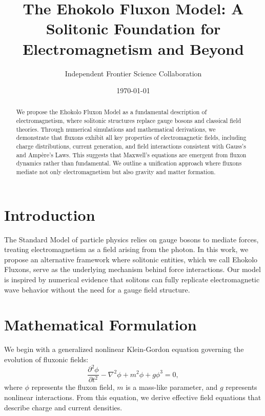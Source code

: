 \documentclass{article}
\title{The Ehokolo Fluxon Model: A Solitonic Foundation for Electromagnetism and Beyond}
\author{Independent Frontier Science Collaboration}
\date{\today}
\begin{document}
\maketitle

\begin{abstract}
We propose the Ehokolo Fluxon Model as a fundamental description of electromagnetism, where solitonic structures replace gauge bosons and classical field theories. Through numerical simulations and mathematical derivations, we demonstrate that fluxons exhibit all key properties of electromagnetic fields, including charge distributions, current generation, and field interactions consistent with Gauss's and Ampère's Laws. This suggests that Maxwell's equations are emergent from fluxon dynamics rather than fundamental. We outline a unification approach where fluxons mediate not only electromagnetism but also gravity and matter formation.
\end{abstract}

\section{Introduction}
The Standard Model of particle physics relies on gauge bosons to mediate forces, treating electromagnetism as a field arising from the photon. In this work, we propose an alternative framework where solitonic entities, which we call Ehokolo Fluxons, serve as the underlying mechanism behind force interactions. Our model is inspired by numerical evidence that solitons can fully replicate electromagnetic wave behavior without the need for a gauge field structure.

\section{Mathematical Formulation}
We begin with a generalized nonlinear Klein-Gordon equation governing the evolution of fluxonic fields:
\begin{equation}
\frac{\partial^2 \phi}{\partial t^2} - \nabla^2 \phi + m^2 \phi + g \phi^3 = 0,
\end{equation}
where $\phi$ represents the fluxon field, $m$ is a mass-like parameter, and $g$ represents nonlinear interactions. From this equation, we derive effective field equations that describe charge and current densities.
\end{document}
